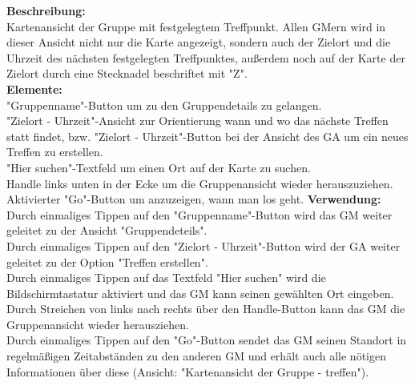 \textbf{Beschreibung:}\\
Kartenansicht der Gruppe mit festgelegtem Treffpunkt. Allen GMern wird in dieser Ansicht nicht nur die Karte angezeigt, sondern auch der Zielort und die Uhrzeit des nächsten festgelegten Treffpunktes, außerdem noch auf der Karte der Zielort durch eine Stecknadel beschriftet mit "Z".\\
\textbf{Elemente:}\\
"Gruppenname"-Button um zu den Gruppendetails zu gelangen.\\
"Zielort - Uhrzeit"-Ansicht zur Orientierung wann und wo das nächste Treffen statt findet, bzw. "Zielort - Uhrzeit"-Button bei der Ansicht des GA um ein neues Treffen zu erstellen.\\
"Hier suchen"-Textfeld um einen Ort auf der Karte zu suchen.\\
Handle links unten in der Ecke um die Gruppenansicht wieder herauszuziehen.\\
Aktivierter "Go"-Button um anzuzeigen, wann man los geht.
\textbf{Verwendung:}\\
Durch einmaliges Tippen auf den "Gruppenname"-Button wird das GM weiter geleitet zu der Ansicht "Gruppendeteils".\\
Durch einmaliges Tippen auf den "Zielort - Uhrzeit"-Button wird der GA weiter geleitet zu der Option "Treffen erstellen".\\
Durch einmaliges Tippen auf das Textfeld "Hier suchen" wird die Bildschirmtastatur aktiviert und das GM kann seinen gewählten Ort eingeben.\\
Durch Streichen von links nach rechts über den Handle-Button kann das GM die Gruppenansicht wieder herausziehen.\\
Durch einmaliges Tippen auf den "Go"-Button sendet das GM seinen Standort in regelmäßigen Zeitabständen zu den anderen GM und erhält auch alle nötigen Informationen über diese (Ansicht: "Kartenansicht der Gruppe - treffen").
\newpage


